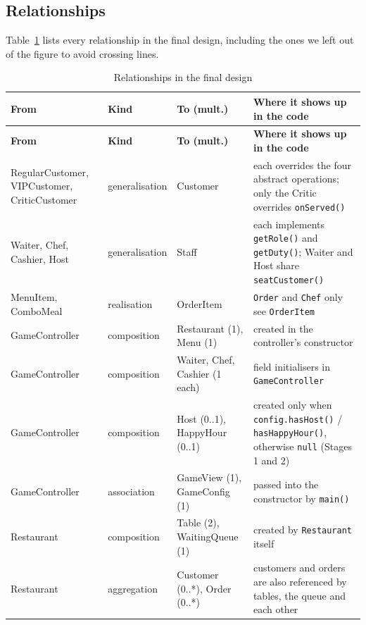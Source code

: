 \clearpage
\restoregeometry

\subsection{Relationships}

Table~\ref{tab:relationships} lists every relationship in the final design, including the
ones we left out of the figure to avoid crossing lines.

\begin{longtable}{@{}>{\raggedright\arraybackslash}p{3.1cm}>{\raggedright\arraybackslash}p{2.3cm}>{\raggedright\arraybackslash}p{2.9cm}>{\raggedright\arraybackslash}p{6.3cm}@{}}
\caption{Relationships in the final design}\label{tab:relationships}\\
\toprule
\textbf{From} & \textbf{Kind} & \textbf{To (mult.)} & \textbf{Where it shows up in the code} \\
\midrule
\endfirsthead
\toprule
\textbf{From} & \textbf{Kind} & \textbf{To (mult.)} & \textbf{Where it shows up in the code} \\
\midrule
\endhead
RegularCustomer, VIPCustomer, CriticCustomer & generalisation & Customer & each overrides the four abstract operations; only the Critic overrides \texttt{onServed()} \\
Waiter, Chef, Cashier, Host & generalisation & Staff & each implements \texttt{getRole()} and \texttt{getDuty()}; Waiter and Host share \texttt{seatCustomer()} \\
MenuItem, ComboMeal & realisation & OrderItem & \texttt{Order} and \texttt{Chef} only see \texttt{OrderItem} \\
GameController & composition & Restaurant (1), Menu (1) & created in the controller's constructor \\
GameController & composition & Waiter, Chef, Cashier (1 each) & field initialisers in \texttt{GameController} \\
GameController & composition & Host (0..1), HappyHour (0..1) & created only when \texttt{config.hasHost()} / \texttt{hasHappyHour()}, otherwise \texttt{null} (Stages 1 and 2) \\
GameController & association & GameView (1), GameConfig (1) & passed into the constructor by \texttt{main()} \\
Restaurant & composition & Table (2), WaitingQueue (1) & created by \texttt{Restaurant} itself \\
Restaurant & aggregation & Customer (0..*), Order (0..*) & customers and orders are also referenced by tables, the queue and each other \\

\end{longtable}

